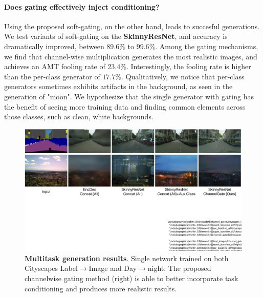 \paragraph{Does gating effectively inject conditioning?} Using the proposed soft-gating, on the other hand, leads to succesful generations. We test variants of soft-gating on the \textbf{SkinnyResNet}, and accuracy is dramatically improved, between $89.6\%$ to $99.6\%$. Among the gating mechanisms, we find that channel-wise multiplication
generates the most realistic images, and achieves an AMT fooling rate of $23.4\%$. Interestingly, the fooling rate is higher than the per-class generator of $17.7\%$. Qualitatively, we notice that per-class generators sometimes exhibits artifacts in the background, as seen in the generation of "moon". We hypothesize that the single generator with gating has the benefit of seeing more training data and finding common elements across those classes, such as clean, white backgrounds.



\begin{figure}[h]
    \centering
    \includegraphics[width=1.\linewidth]{paper_images/multitask_comp.pdf}
    \caption{\textbf{Multitask generation results}. Single network trained on both Cityscapes Label$\rightarrow$Image and Day$\rightarrow$night. The proposed channelwise gating method (right) is able to better incorporate task conditioning and produces more realistic results.
    }
    \label{fig:multi-task_day2night}
    \vspace{-2mm}
\end{figure}

